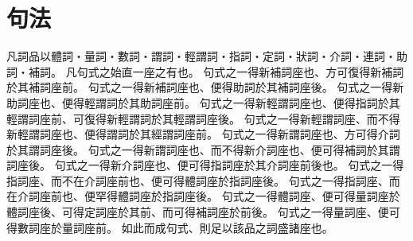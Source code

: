 \chapter{句法}
凡詞品以體詞・量詞・數詞・謂詞・輕謂詞・指詞・定詞・狀詞・介詞・連詞・助詞・補詞。
凡句式之始直一座之有也。
句式之一得新補詞座也、方可復得新補詞於其補詞座前。
句式之一得新補詞座也、便得助詞於其補詞座後。
句式之一得新助詞座也、便得輕謂詞於其助詞座前。
句式之一得新輕謂詞座也、便得指詞於其輕謂詞座前、可復得新輕謂詞於其輕謂詞座後。
句式之一得新輕謂詞座、而不得新輕謂詞座也、便得謂詞於其經謂詞座前。
句式之一得新謂詞座也、方可得介詞於其謂詞座後。
句式之一得新謂詞座也、而不得新介詞座也、便可得補詞於其謂詞座後。
句式之一得新介詞座也、便可得指詞座於其介詞座前後也。
句式之一得指詞座、而不在介詞座前也、便可得體詞座於指詞座後。
句式之一得指詞座、而在介詞座前也、便罕得體詞座於指詞座後。
句式之一得體詞座、便可得量詞座於體詞座後、可得定詞座於其前、而可得補詞座於前後。
句式之一得量詞座、便可得數詞座於量詞座前。
如此而成句式、則足以該品之詞盛諸座也。
